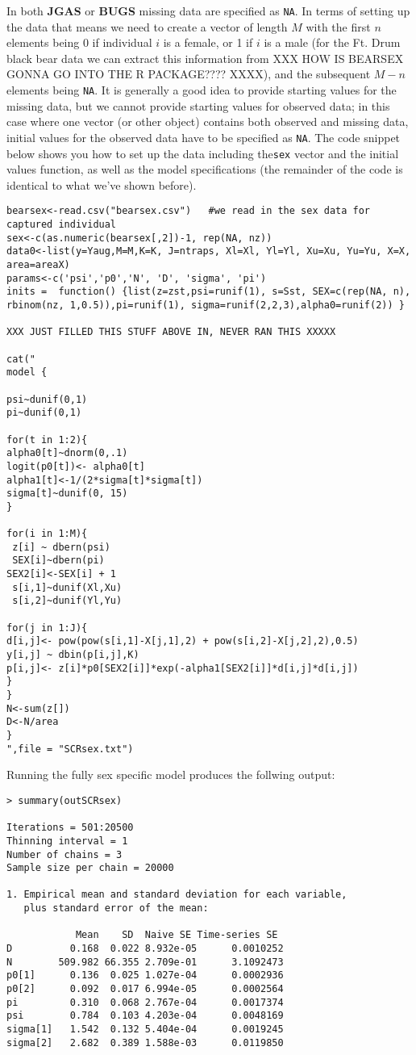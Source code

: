 In both {\bf JGAS} or {\bf BUGS} missing data are specified as {\tt NA}. In terms of setting up the data that means we need to create a vector of length $M$ with the first $n$ elements being 0 if individual $i$ is a female, or 1 if $i$ is a male (for the Ft. Drum black bear data we can extract this information from XXX HOW IS BEARSEX GONNA GO INTO THE R PACKAGE???? XXXX), and the subsequent $M-n$ elements being {\tt NA}.  It is generally a good idea to provide starting values for the missing data, but we cannot provide starting values for observed data; in this case where one vector (or other object) contains both observed and missing data, initial values for the observed data have to be specified as {\tt NA}. The code snippet below shows you how to set up the  data including the{\tt sex} vector and the initial values function, as well as the {\JAGS} model specifications (the remainder of the code is identical to what we've shown before).


{\small
\begin{verbatim}
bearsex<-read.csv("bearsex.csv")   #we read in the sex data for captured individual
sex<-c(as.numeric(bearsex[,2])-1, rep(NA, nz))
data0<-list(y=Yaug,M=M,K=K, J=ntraps, Xl=Xl, Yl=Yl, Xu=Xu, Yu=Yu, X=X, area=areaX)
params<-c('psi','p0','N', 'D', 'sigma', 'pi')
inits =  function() {list(z=zst,psi=runif(1), s=Sst, SEX=c(rep(NA, n), rbinom(nz, 1,0.5)),pi=runif(1), sigma=runif(2,2,3),alpha0=runif(2)) }

XXX JUST FILLED THIS STUFF ABOVE IN, NEVER RAN THIS XXXXX

cat("
model {

psi~dunif(0,1)
pi~dunif(0,1)

for(t in 1:2){
alpha0[t]~dnorm(0,.1)
logit(p0[t])<- alpha0[t]
alpha1[t]<-1/(2*sigma[t]*sigma[t])
sigma[t]~dunif(0, 15)
}

for(i in 1:M){
 z[i] ~ dbern(psi)
 SEX[i]~dbern(pi)
SEX2[i]<-SEX[i] + 1
 s[i,1]~dunif(Xl,Xu)
 s[i,2]~dunif(Yl,Yu)

for(j in 1:J){
d[i,j]<- pow(pow(s[i,1]-X[j,1],2) + pow(s[i,2]-X[j,2],2),0.5)
y[i,j] ~ dbin(p[i,j],K)
p[i,j]<- z[i]*p0[SEX2[i]]*exp(-alpha1[SEX2[i]]*d[i,j]*d[i,j])
}
}
N<-sum(z[])
D<-N/area
}
",file = "SCRsex.txt")
\end{verbatim}
}

Running the fully sex specific model produces the follwing output: 
{\small
\begin{verbatim}
> summary(outSCRsex)

Iterations = 501:20500
Thinning interval = 1
Number of chains = 3
Sample size per chain = 20000

1. Empirical mean and standard deviation for each variable,
   plus standard error of the mean:

            Mean    SD  Naive SE Time-series SE
D          0.168  0.022 8.932e-05      0.0010252
N        509.982 66.355 2.709e-01      3.1092473
p0[1]      0.136  0.025 1.027e-04      0.0002936
p0[2]      0.092  0.017 6.994e-05      0.0002564
pi         0.310  0.068 2.767e-04      0.0017374
psi        0.784  0.103 4.203e-04      0.0048169
sigma[1]   1.542  0.132 5.404e-04      0.0019245
sigma[2]   2.682  0.389 1.588e-03      0.0119850
\end{verbatim}
}


